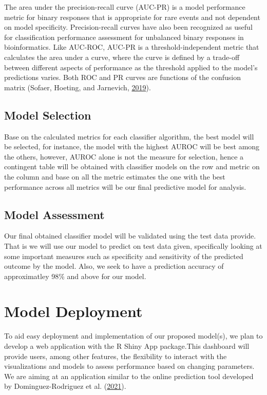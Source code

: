 \documentclass[
  10pt,
]{article}
\begin{document}
The area under the precision-recall curve (AUC-PR) is a model performance metric for binary responses that is appropriate for rare events and not dependent on model specificity. Precision-recall
curves have also been recognized as useful for classification performance assessment for unbalanced binary responses in bioinformatics. Like AUC-ROC, AUC-PR is a threshold-independent metric that calculates the area under a curve, where the curve is defined by a trade-off between different aspects of performance as the threshold applied to the model's predictions varies. Both ROC and PR curves are functions of the confusion matrix (Sofaer, Hoeting, and Jarnevich, \protect\hyperlink{ref-sofaer2019area}{2019}).

\subsection{Model Selection}

Base on the calculated metrics for each classifier algorithm, the best model will be selected, for instance, the model with the highest AUROC will be best among the others, however, AUROC alone is not the measure for selection, hence a contingent table will be obtained with classifier models on the row and metric on the column and base on all the metric estimates the one with the best performance across all metrics will be our final predictive model for analysis.

\subsection{Model Assessment}

Our final obtained classifier model will be validated using the test data provide. That is we will use our model to predict on test data given, specifically looking at some important measures such as specificity and sensitivity of the predicted outcome by the model. Also, we seek to have a prediction accuracy of approximatley 98\% and above for our model.

\section{Model Deployment}

To aid easy deployment and implementation of our proposed model(s), we plan to develop a web application with the R Shiny App package.This dashboard will provide users, among other features, the flexibility to interact with the visualizations and models to assess performance based on changing parameters. We are aiming at an application similar to the online prediction tool developed by Dominguez-Rodriguez et al. (\protect\hyperlink{ref-dominguez2021bayesian}{2021}).
\end{document}
